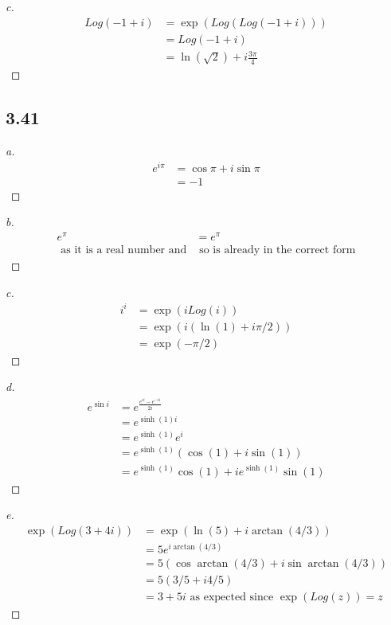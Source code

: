 \documentclass[a4paper, 11pt]{article}
\begin{document}
	\begin{proof}[c]
		\begin{align*}
			Log(-1+i)&= \exp(Log(Log(-1+i))) \\ 
				&= Log(-1+i) \\ 
				&= \ln(\sqrt{2})+i\frac{3\pi}{4}
		\end{align*}
	\end{proof}


\subsection*{3.41}
	\begin{proof}[a]
		\begin{align*}
			e^{i\pi} &= \cos \pi + i \sin \pi \\ 
				&= -1 
		\end{align*}
	\end{proof}
	
	\begin{proof}[b]
		\begin{align*}
			e^\pi &= e^\pi \\ 
			\text{ as it is a real number and}&\text{ so is already in the correct form} 
		\end{align*}
	\end{proof}
	
	\begin{proof}[c]
		\begin{align*}
			i^i &= \exp(iLog(i)) \\ 
				&= \exp(i(\ln(1)+i\pi/2)) \\ 
				&= \exp(-\pi/2)
		\end{align*}
	\end{proof}
	
	\begin{proof}[d]
		\begin{align*}
			e^{\sin i} &= e^{\frac{e^{ii}-e^{-ii}}{2i}} \\ 
				&= e^{\sinh(1)i}\\
				&= e^{\sinh(1)}e^i \\ 
				&= e^{\sinh(1)}(\cos(1)+i\sin(1)) \\ 
				&= e^{\sinh(1)}\cos(1) + ie^{\sinh(1)}\sin(1) 
		\end{align*}
	\end{proof}

	\begin{proof}[e]
		\begin{align*}
			\exp(Log(3+4i)) &= \exp(\ln(5)+i\arctan(4/3)) \\ 
				&= 5e^{i\arctan(4/3)} \\ 
				&= 5(\cos\arctan(4/3)+i\sin\arctan(4/3)) \\ 
				&= 5(3/5 + i4/5) \\ 
				&= 3 + 5i \text{ as expected since } \exp(Log(z)) = z 
		\end{align*}
	\end{proof}
\end{document}
